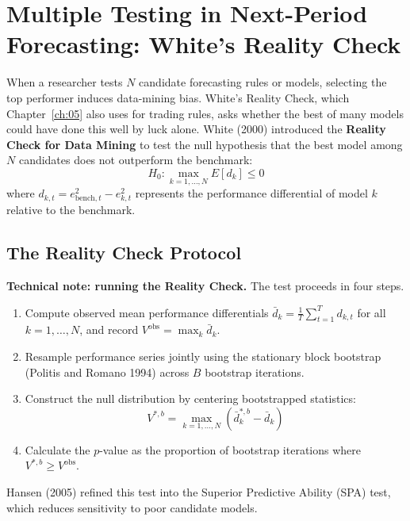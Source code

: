 \section{Multiple Testing in Next-Period Forecasting: White's Reality Check}
\label{sec:09-reality}

When a researcher tests $N$ candidate forecasting rules or models, selecting the top performer induces data-mining bias. White's Reality Check, which Chapter~\ref{ch:05} also uses for trading rules, asks whether the best of many models could have done this well by luck alone. White (2000) introduced the \textbf{Reality Check for Data Mining} to test the null hypothesis that the best model among $N$ candidates does not outperform the benchmark:
\begin{equation}
  H_0: \max_{k=1, \dots, N} E[d_k] \le 0
  \label{eq:09-white-null}
\end{equation}
where $d_{k,t} = e^2_{\text{bench},t} - e^2_{k,t}$ represents the performance differential of model $k$ relative to the benchmark.

\subsection{The Reality Check Protocol}
\begin{technote}
\textbf{Technical note: running the Reality Check.} The test proceeds in four steps.
\begin{enumerate}
  \item Compute observed mean performance differentials $\bar{d}_k = \frac{1}{T} \sum_{t=1}^T d_{k,t}$ for all $k = 1, \dots, N$, and record $V^{\text{obs}} = \max_k \bar{d}_k$.
  \item Resample performance series jointly using the stationary block bootstrap (Politis and Romano 1994) across $B$ bootstrap iterations.
  \item Construct the null distribution by centering bootstrapped statistics:
  \begin{equation}
    V^{*,b} = \max_{k=1, \dots, N} \left( \bar{d}_{k}^{*,b} - \bar{d}_k \right)
  \end{equation}
  \item Calculate the $p$-value as the proportion of bootstrap iterations where $V^{*,b} \ge V^{\text{obs}}$.
\end{enumerate}
\end{technote}
Hansen (2005) refined this test into the Superior Predictive Ability (SPA) test, which reduces sensitivity to poor candidate models.

